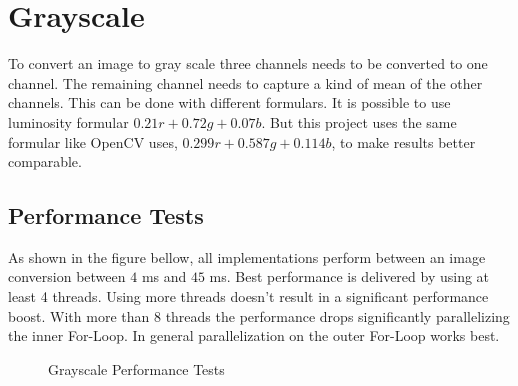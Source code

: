 \chapter{Grayscale}

To convert an image to gray scale three channels needs to be converted to one channel. The remaining channel needs to capture a kind of mean of the other channels. This can be done with different formulars. It is possible to use luminosity formular $ 0.21r + 0.72g + 0.07b $. But this project uses the same formular like OpenCV uses, $ 0.299r + 0.587g + 0.114b $, to make results better comparable.

\section{Performance Tests}

As shown in the figure bellow, all implementations perform between an image conversion between $ 4 $ ms and $ 45 $ ms. Best performance is delivered by using at least 4 threads. Using more threads doesn't result in a significant performance boost. With more than 8 threads the performance drops significantly parallelizing the inner For-Loop. In general parallelization on the outer For-Loop works best.

\begin{center}
    \begin{figure}[H]
        \centering

        \caption{Grayscale Performance Tests}
    \end{figure}
\end{center}

